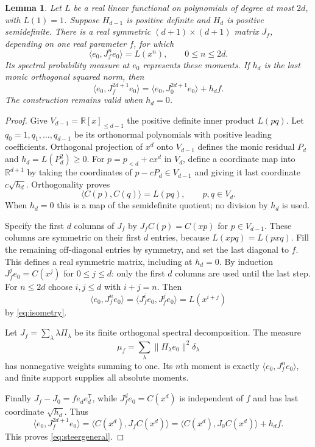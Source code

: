 \documentclass[11pt]{article}
\newtheorem{lemma}[theorem]{Lemma}
\newcommand{\R}{\mathbb R}
\begin{document}
\begin{lemma}\label{lem:jacobi}
Let $L$ be a real linear functional on polynomials of
degree at most $2d$, with $L(1)=1$. Suppose $H_{d-1}$
is positive definite and $H_d$ is positive semidefinite.
There is a real symmetric $(d+1)\times(d+1)$ matrix $J_f$,
depending on one real parameter $f$, for which
\[
 \langle e_0,J_f^n e_0\rangle=L(x^n),\qquad0\leq n\leq2d.
\]
Its spectral probability measure at $e_0$ represents
these moments. If $h_d$ is the last monic orthogonal
squared norm, then
\begin{equation}\label{eq:steergeneral}
 \langle e_0,J_f^{2d+1}e_0\rangle
 =\langle e_0,J_0^{2d+1}e_0\rangle+h_df.
\end{equation}
The construction remains valid when $h_d=0$.
\end{lemma}
\begin{proof}
Give $V_{d-1}=\R[x]_{\leq d-1}$ the positive definite
inner product $L(pq)$. Let $q_0=1,q_1,\ldots,q_{d-1}$
be its orthonormal polynomials with positive leading
coefficients. Orthogonal projection of $x^d$ onto
$V_{d-1}$ defines the monic residual $P_d$ and
$h_d=L(P_d^2)\geq0$.
For $p=p_{<d}+c x^d$ in $V_d$, define a coordinate map
into $\R^{d+1}$ by taking the coordinates of
$p-cP_d\in V_{d-1}$ and giving it last coordinate
$c\sqrt{h_d}$. Orthogonality proves
\begin{equation}\label{eq:isometry}
 \langle C(p),C(q)\rangle=L(pq),\qquad p,q\in V_d.
\end{equation}
When $h_d=0$ this is a map of the semidefinite quotient;
no division by $h_d$ is used.

Specify the first $d$ columns of $J_f$ by
$J_f C(p)=C(xp)$ for $p\in V_{d-1}$.
These columns are symmetric on their first $d$ entries,
because $L(xpq)=L(pxq)$. Fill the remaining off-diagonal
entries by symmetry, and set the last diagonal to $f$.
This defines a real symmetric matrix, including at $h_d=0$.
By induction $J_f^j e_0=C(x^j)$ for $0\leq j\leq d$:
only the first $d$ columns are used until the last step.
For $n\leq2d$ choose $i,j\leq d$ with $i+j=n$. Then
\[
 \langle e_0,J_f^n e_0\rangle
 =\langle J_f^i e_0,J_f^j e_0\rangle
 =L(x^{i+j})
\]
by \eqref{eq:isometry}.

Let $J_f=\sum_\lambda\lambda\Pi_\lambda$ be its finite
orthogonal spectral decomposition. The measure
\begin{equation}\label{eq:spectralmeasure}
 \mu_f=\sum_\lambda\|\Pi_\lambda e_0\|^2\delta_\lambda
\end{equation}
has nonnegative weights summing to one. Its $n$th moment
is exactly $\langle e_0,J_f^n e_0\rangle$, and finite
support supplies all absolute moments.

Finally $J_f-J_0=f e_d e_d^\mathsf T$, while
$J_f^d e_0=C(x^d)$ is independent of $f$ and has last
coordinate $\sqrt{h_d}$. Thus
\[
 \langle e_0,J_f^{2d+1}e_0\rangle
 =\langle C(x^d),J_f C(x^d)\rangle
 =\langle C(x^d),J_0 C(x^d)\rangle+h_df.
\]
This proves \eqref{eq:steergeneral}.
\end{proof}
\end{document}

